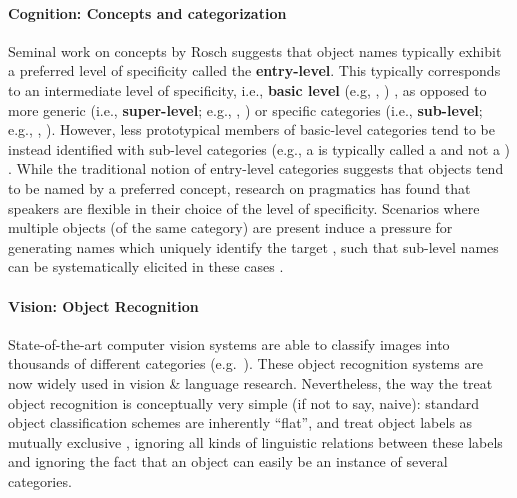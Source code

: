 \paragraph{Cognition: Concepts and categorization}

 Seminal work on concepts by Rosch suggests that object names typically exhibit a preferred level of specificity called the \textbf{entry-level}. This typically corresponds to an intermediate level of specificity, i.e., \textbf{basic level} (e.g, , ) \cite{rosch1976basic}, as opposed to more generic (i.e., \textbf{super-level}; e.g., , ) or specific categories (i.e., \textbf{sub-level}; e.g., , ). However, less prototypical members of basic-level categories tend to be instead identified with sub-level categories (e.g., a  is typically called a  and not a ) \cite{jolicoeur1984pictures}. 
While the traditional notion of entry-level categories suggests that objects tend to be named by a  preferred concept, research on pragmatics has found that speakers are flexible in  
their choice of the level of specificity. 
Scenarios where multiple objects (of the same category) are present induce a pressure for generating names which uniquely identify the target \cite{olson1970language}, such that sub-level names can be systematically elicited in these cases %
\cite{rohde2012communicating,graf2016animal}.

\paragraph{Vision: Object Recognition}

State-of-the-art computer vision systems are able to classify images into thousands of different categories (e.g.\  ). These object recognition systems are now widely used in vision \& language research.
Nevertheless, the way the treat object recognition is conceptually very simple (if not to say, naive):  standard object classification schemes are inherently ``flat'', and treat object labels as mutually exclusive \cite{deng2014large}, ignoring all kinds of linguistic relations between these labels and ignoring the fact that an object can easily be an instance of several categories.


